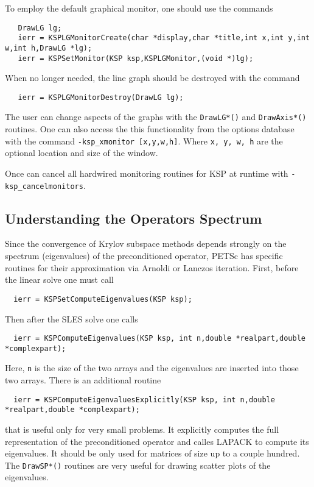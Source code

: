 To employ the default graphical monitor, one should use the 
commands  
\begin{verbatim}
   DrawLG lg;
   ierr = KSPLGMonitorCreate(char *display,char *title,int x,int y,int w,int h,DrawLG *lg);
   ierr = KSPSetMonitor(KSP ksp,KSPLGMonitor,(void *)lg);
\end{verbatim}
When no longer needed, the line graph should be destroyed 
with the command
\begin{verbatim}
   ierr = KSPLGMonitorDestroy(DrawLG lg);
\end{verbatim}
The user can change aspects of the graphs with the {\tt DrawLG*()} and 
{\tt DrawAxis*()} routines.  
One can also access the this functionality from the options database 
with the command {\tt -ksp\_xmonitor [x,y,w,h]}.  
Where {\tt x, y, w, h} are the optional location and size of the window.

Once can cancel all hardwired monitoring routines for KSP at runtime with 
{\tt -ksp\_cancelmonitors}. 

\subsection{Understanding the Operators Spectrum}
Since the convergence of Krylov subspace methods depends strongly on 
the spectrum (eigenvalues) of the preconditioned operator, PETSc has specific
routines for their approximation via Arnoldi or Lanczos iteration.
First, before the linear solve one must call 
\begin{verbatim}
  ierr = KSPSetComputeEigenvalues(KSP ksp);
\end{verbatim}
Then after the SLES solve one calls 
\begin{verbatim}
  ierr = KSPComputeEigenvalues(KSP ksp, int n,double *realpart,double *complexpart);
\end{verbatim}
Here, {\tt n} is the size of the two arrays and the eigenvalues are 
inserted into those two arrays. 
There is an additional routine 
\begin{verbatim}
  ierr = KSPComputeEigenvaluesExplicitly(KSP ksp, int n,double *realpart,double *complexpart);
\end{verbatim}
that is useful only for very small problems. It explicitly computes the 
full representation of the preconditioned operator and calles LAPACK to 
compute its eigenvalues. It should be only used for matrices of size up to 
a couple hundred.  The {\tt DrawSP*()} routines are very useful for 
drawing scatter plots of the eigenvalues. 

